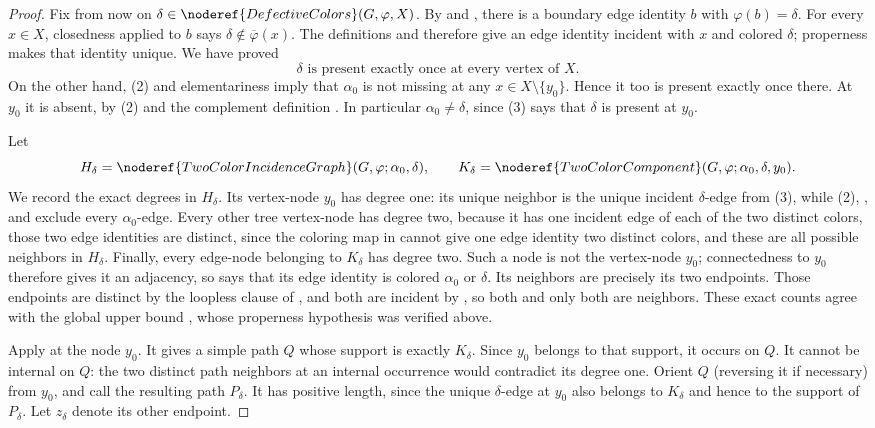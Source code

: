 \begin{proof}
Fix from now on
$\delta\in\noderef{DefectiveColors}(G,\varphi,X)$.  By
 and , there is a
boundary edge identity $b$ with $\varphi(b)=\delta$.  For every $x\in X$,
closedness applied to $b$ says
$\delta\notin\overline\varphi(x)$.  The definitions
 and  therefore give an edge
identity incident with $x$ and colored $\delta$; properness makes that
identity unique.  We have proved
\[
 \text{$\delta$ is present exactly once at every vertex of $X$.} \tag{3}
\]
On the other hand, (2) and elementariness imply that $\alpha _0$ is not
missing at any $x\in X\setminus\{y_0\}$.  Hence it too is present exactly
once there.  At $y_0$ it is absent, by (2) and the complement definition
.  In particular $\alpha _0\ne\delta$, since (3)
says that $\delta$ is present at $y_0$.

Let
\[
 H_\delta=\noderef{TwoColorIncidenceGraph}
       (G,\varphi;\alpha _0,\delta),\qquad
 K_\delta=\noderef{TwoColorComponent}
       (G,\varphi;\alpha _0,\delta,y_0).
\]
We record the exact degrees in $H_\delta$.  Its vertex-node $y_0$ has
degree one: its unique neighbor is the unique incident $\delta$-edge from
(3), while (2), , and
 exclude every $\alpha _0$-edge.  Every
other tree vertex-node has degree two, because it has one incident edge of
each of the two distinct colors, those two edge identities are distinct,
since the coloring map in  cannot give one
edge identity two distinct colors, and these are all possible neighbors in
$H_\delta$.  Finally, every
edge-node belonging to $K_\delta$ has degree two.  Such a node is not the
vertex-node $y_0$; connectedness to $y_0$ therefore gives it an adjacency,
so  says that its edge identity is colored
$\alpha _0$ or $\delta$.  Its neighbors are precisely its two endpoints.
Those endpoints are distinct by the loopless clause of
, and both are incident by
, so both and only both are neighbors.  These exact
counts agree with the global upper bound
, whose properness hypothesis was
verified above.

Apply  at the node $y_0$.  It gives
a simple path $Q$ whose support is exactly $K_\delta$.  Since $y_0$ belongs
to that support, it occurs on $Q$.  It cannot be internal on $Q$: the two
distinct path neighbors at an internal occurrence would contradict its
degree one.  Orient $Q$ (reversing it if necessary) from $y_0$, and call
the resulting path $P_\delta$.  It has positive length, since the unique
$\delta$-edge at $y_0$ also belongs to $K_\delta$ and hence to the support
of $P_\delta$.  Let $z_\delta$ denote its other endpoint.


\end{proof}

